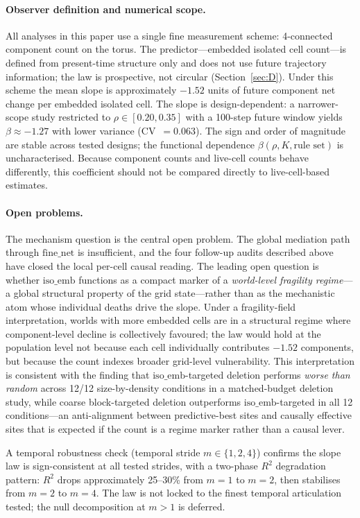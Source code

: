 \documentclass[aip,cha,preprint,nofootinbib]{revtex4-2}
\newcommand{\iso}{\mathrm{iso\_emb}}
\newcommand{\fnet}{\mathrm{fine\_net}}
\begin{document}
\paragraph{Observer definition and numerical scope.}
All analyses in this paper use a single fine measurement scheme:
4-connected component count on the torus.
The predictor---embedded isolated cell count---is defined from present-time
structure only and does not use future trajectory information; the law is
prospective, not circular (Section~\ref{sec:D}).
Under this scheme the mean slope is approximately $-1.52$ units of future
component net change per embedded isolated cell.
The slope is design-dependent: a narrower-scope study restricted to
$\rho\in[0.20,0.35]$ with a 100-step future window yields
$\beta\approx-1.27$ with lower variance (CV~$=0.063$).
The sign and order of magnitude are stable across tested designs; the
functional dependence $\beta(\rho,K,\text{rule set})$ is uncharacterised.
Because component counts and live-cell counts behave differently, this
coefficient should not be compared directly to live-cell-based estimates.

\paragraph{Open problems.}
The mechanism question is the central open problem.
The global mediation path through $\fnet$ is insufficient, and the four
follow-up audits described above have closed the local per-cell causal
reading.
The leading open question is whether $\iso$ functions as a compact marker of
a \textit{world-level fragility regime}---a global structural property of
the grid state---rather than as the mechanistic atom whose individual deaths
drive the slope.
Under a fragility-field interpretation, worlds with more embedded cells are
in a structural regime where component-level decline is collectively favoured;
the law would hold at the population level not because each cell individually
contributes $-1.52$ components, but because the count indexes broader
grid-level vulnerability.
This interpretation is consistent with the finding that
$\iso$-targeted deletion performs \emph{worse than random} across 12/12
size-by-density conditions in a matched-budget deletion study, while
coarse block-targeted deletion outperforms $\iso$-targeted in all 12
conditions---an anti-alignment between predictive-best sites and
causally effective sites that is expected if the count is a regime marker
rather than a causal lever.

A temporal robustness check (temporal stride $m\in\{1,2,4\}$) confirms the
slope law is sign-consistent at all tested strides, with a two-phase $R^2$
degradation pattern: $R^2$ drops approximately 25--30\% from $m=1$ to
$m=2$, then stabilises from $m=2$ to $m=4$.
The law is not locked to the finest temporal articulation tested; the null
decomposition at $m>1$ is deferred.
\end{document}
